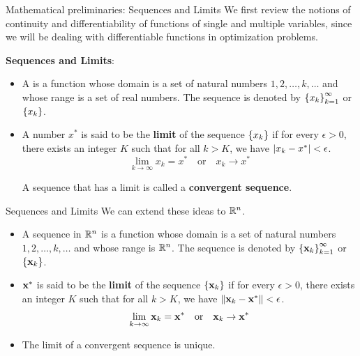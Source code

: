 \documentclass[aspectratio=169]{beamer}
\let\olditem\item
\renewcommand{\item}{\setlength{\itemsep}{\fill}\olditem}
\def\mf{\ensuremath\mathbf}
\def\mb{\ensuremath\mathbb}
\def\lv{\ensuremath\left\lvert}
\def\rv{\ensuremath\right\rvert}
\def\lV{\ensuremath\left\lVert}
\def\rV{\ensuremath\right\rVert}
\def\lc{\ensuremath\left\{}
\def\rc{\ensuremath\right\}}
\def\R{\ensuremath\mb{R}}
\begin{document}
\begin{frame}[t]{Mathematical preliminaries: Sequences and Limits}
  We first review the notions of continuity and differentiability of functions of single and multiple variables, since we will be dealing with differentiable functions in optimization problems.
  \vspace{0.2cm}

  \textbf{Sequences and Limits}:
  \begin{itemize}
    \item A  is a function whose domain is a set of natural numbers $1, 2, \ldots, k, \ldots$ and whose range is a set of real numbers. The sequence is denoted by $\lc x_k\rc_{k=1}^{\infty}$ or $\lc x_k \rc$.
    \vspace{0.25cm}
  
    \item A number $x^{*}$ is said to be the \textbf{limit} of the sequence $\lc x_k \rc$ if for every $\epsilon > 0$, there exists an integer $K$ such that for all $k > K$, we have $\lv x_k - x^{*} \rv < \epsilon$.
    \[ \lim_{k \to \infty} x_k = x^* \quad \mathrm{or} \quad x_k \to x^* \]

    A sequence that has a limit is called a \textbf{convergent sequence}.
  \end{itemize}
\end{frame}


\begin{frame}[t]{Sequences and Limits}
  We can extend these ideas to $\R^n$.
  \begin{itemize}
    \item A sequence in $\R^n$ is a function whose domain is a set of natural numbers $1, 2, \ldots, k, \ldots$ and whose range is $\R^n$. The sequence is denoted by $\lc \mf{x}_k\rc_{k=1}^{\infty}$ or $\lc \mf{x}_k \rc$.
    \vspace{0.25cm}
  
    \item $\mf{x}^{*}$ is said to be the \textbf{limit} of the sequence $\lc \mf{x}_k \rc$ if for every $\epsilon > 0$, there exists an integer $K$ such that for all $k > K$, we have $\lV \mf{x}_k - \mf{x}^{*} \rV < \epsilon$.
    \[ \lim_{k \to \infty} \mf{x}_k = \mf{x}^* \quad \mathrm{or} \quad \mf{x}_k \to \mf{x}^* \]

    \item The limit of a convergent sequence is unique.
  \end{itemize}
\end{frame}
\end{document}
